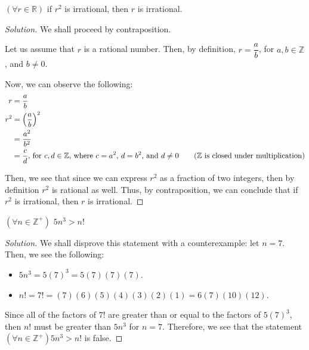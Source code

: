 \documentclass{article}
\newenvironment{solution}{\begin{proof}[Solution]}{\end{proof}}
\newcommand{\all}{\forall}
\newcommand{\RR}{\mathbb{R}}
\newcommand{\ZZ}{\mathbb{Z}}
\begin{document}
\begin{hw}
	$\left( \all r \in \RR \right)$ if $r^{2}$ is irrational, then $r$ is irrational.
\end{hw}
\begin{solution}
	We shall proceed by contraposition.
	
	Let us assume that $r$ is a rational number. Then, by definition, $r = \dfrac{a}{b}$, for $a,b \in \ZZ$, and $b \not= 0$. 
	
	Now, we can observe the following:
	\begin{align*}
		r &= \dfrac{a}{b} \\
		r^{2} &= \left( \dfrac{a}{b} \right) ^{2} \\
		&= \dfrac{a^{2}}{b^{2}} \\
		&= \dfrac{c}{d}\text{, for $c,d \in \ZZ$, where $c=a^{2}$, $d=b^{2}$, and $d \not= 0$} \tag{$\ZZ$ is closed under multiplication}
	\end{align*}

	Then, we see that since we can express $r^{2}$ as a fraction of two integers, then by definition $r^{2}$ is rational as well. Thus, by contraposition, we can conclude that if $r^{2}$ is irrational, then $r$ is irrational.
\end{solution}

\begin{hw}
	$\left( \all n \in \ZZ^{+} \right)$ $5n^{3} > n!$
\end{hw}
\begin{solution}
	We shall disprove this statement with a counterexample: let $n=7$. Then, we see the following:
	 \begin{itemize}
	 	\item $5n^{3} = 5(7)^{3} = 5\left( 7 \right)\left( 7 \right)\left( 7 \right)$.
	 	\item $n! = 7! = \left( 7 \right)\left( 6 \right)\left( 5 \right)\left( 4 \right)\left( 3 \right)\left( 2 \right)\left( 1 \right) = 6\left( 7 \right)\left( 10 \right)\left( 12 \right)$.

	 \end{itemize}	
	Since all of the factors of $7!$ are greater than or equal to the factors of $5(7)^{3}$, then $n!$ must be greater than $5n^{3}$ for $n=7$. Therefore, we see that the statement $\left( \all n \in \ZZ^{+} \right)5n^{3} > n!$ is false.
\end{solution}

\newpage
\end{document}
